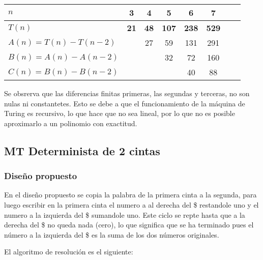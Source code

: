 \begin{table}[h]
    \centering
    \begin{tabular}{|l|c|c|c|c|c|c|c|}
        \hline
        $n$ & \textbf{3} & \textbf{4} & \textbf{5} & \textbf{6} & \textbf{7}\\ \hline
        $T(n)$ & \textbf{21} & \textbf{48} & \textbf{107} & \textbf{238} & \textbf{529}      \\ \hline
        \hline
        $A(n) = T(n) - T(n-2)$ &    & 27 & 59 & 131 & 291 \\ \hline
        $B(n) = A(n) - A(n-2)$ &    &   & 32 & 72 & 160 \\ \hline
        $C(n) = B(n) - B(n-2)$ &    &   &    & 40 & 88 \\ \hline
    \end{tabular}
\end{table}

Se obsrerva que las diferencias finitas primeras, las segundas y terceras, no son nulas ni constantetes. Esto se debe a que el funcionamiento de la máquina de Turing es recursivo, lo que hace que no sea lineal, por lo que no es posible aproximarlo a un polinomio con exactitud.\medskip




\subsection{MT Determinista de 2 cintas}

\subsubsection*{Diseño propuesto}

En el diseño propuesto se copia la palabra de la primera cinta a la segunda, para luego escribir en la primera cinta el numero a al derecha del \$ restandole uno y el numero a la izquierda del \$ sumandole uno. Este ciclo se repte hasta que a la derecha del \$ no queda nada (cero), lo que significa que se ha terminado pues el número a la izquierda del \$ es la suma de los dos números originales.\medskip

El algoritmo de resolución es el siguiente:

